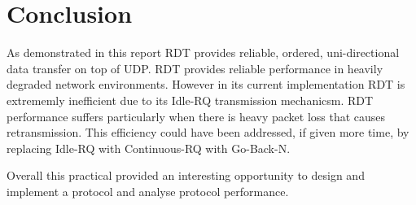 \section{Conclusion}

As demonstrated in this report RDT provides reliable, ordered, uni-directional data transfer on top of UDP. RDT provides reliable  performance in heavily degraded network environments. However in its current implementation RDT is extrememly inefficient due to its Idle-RQ transmission mechanicsm. RDT performance suffers particularly when there is heavy packet loss that causes retransmission. This efficiency could have been addressed, if given more time, by replacing Idle-RQ with Continuous-RQ with Go-Back-N.

Overall this practical provided an interesting opportunity to design and implement a protocol and analyse protocol performance.